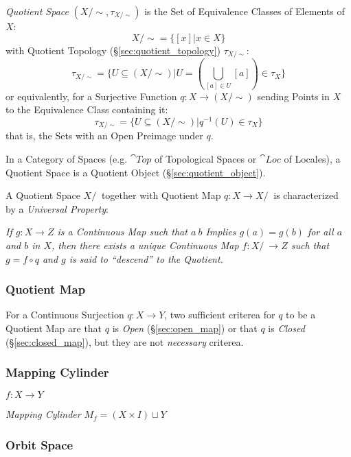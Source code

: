\emph{Quotient Space} $(X/\sim, \tau_{X/\sim})$ is the Set of Equivalence
Classes of Elements of $X$:
\[
  X / \sim = \{ [x] | x \in X \}
\]
with Quotient Topology (\S\ref{sec:quotient_topology}) $\tau_{X/\sim}$:
\[
  \tau_{X/\sim} = \{ U \subseteq (X/\sim) |
    U = (\bigcup_{[a] \in U} [a]) \in \tau_X \}
\]
or equivalently, for a Surjective Function $q : X \rightarrow (X / \sim)$
sending Points in $X$ to the Equivalence Class containing it:
\[
  \tau_{X/\sim} = \{ U \subseteq (X/\sim) | q^{-1}(U) \in \tau_X \}
\]
that is, the Sets with an Open Preimage under $q$.

In a Category of Spaces (e.g. $\cat{Top}$ of Topological Spaces or $\cat{Loc}$
of Locales), a Quotient Space is a Quotient Object
(\S\ref{sec:quotient_object}).

A Quotient Space $X/~$ together with Quotient Map $q : X \rightarrow X/~$ is
characterized by a \emph{Universal Property}:

\emph{If $g : X \rightarrow Z$ is a Continuous Map such that $a ~ b$ Implies $g(a)
  = g(b)$ for all $a$ and $b$ in $X$, then there exists a unique Continuous Map
  $f : X/~ \rightarrow Z$ such that $g = f \circ q$ and $g$ is said to
  ``descend'' to the Quotient.}



\subsubsection{Quotient Map}\label{sec:quotient_map}

For a Continuous Surjection $q : X \rightarrow Y$, two sufficient criterea for
$q$ to be a Quotient Map are that $q$ is \emph{Open} (\S\ref{sec:open_map}) or
that $q$ is \emph{Closed} (\S\ref{sec:closed_map}), but they are not
\emph{necessary} criterea.



\subsubsection{Mapping Cylinder}\label{sec:mapping_cylinder}

$f : X \rightarrow Y$

\emph{Mapping Cylinder} $M_f = (X \times I) \sqcup Y$



\subsubsection{Orbit Space}\label{sec:orbit_space}

